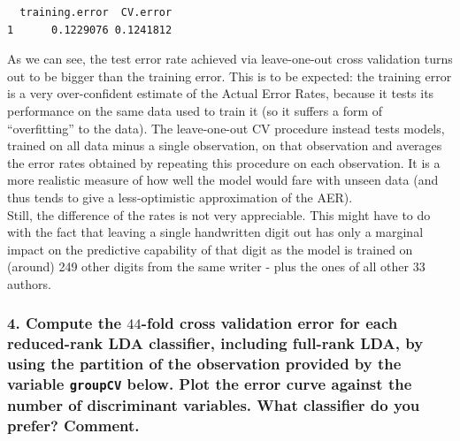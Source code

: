 \documentclass[
  letterpaper,
  DIV=11,
  numbers=noendperiod]{scrartcl}
\begin{document}
\begin{verbatim}
  training.error  CV.error
1      0.1229076 0.1241812
\end{verbatim}

As we can see, the test error rate achieved via leave-one-out cross
validation turns out to be bigger than the training error. This is to be
expected: the training error is a very over-confident estimate of the
Actual Error Rates, because it tests its performance on the same data
used to train it (so it suffers a form of ``overfitting'' to the data).
The leave-one-out CV procedure instead tests models, trained on all data
minus a single observation, on that observation and averages the error
rates obtained by repeating this procedure on each observation. It is a
more realistic measure of how well the model would fare with unseen data
(and thus tends to give a less-optimistic approximation of the AER).\\
Still, the difference of the rates is not very appreciable. This might
have to do with the fact that leaving a single handwritten digit out has
only a marginal impact on the predictive capability of that digit as the
model is trained on (around) 249 other digits from the same writer -
plus the ones of all other 33 authors.

\hypertarget{compute-the-44-fold-cross-validation-error-for-each-reduced-rank-lda-classifier-including-full-rank-lda-by-using-the-partition-of-the-observation-provided-by-the-variable-groupcv-below.-plot-the-error-curve-against-the-number-of-discriminant-variables.-what-classifier-do-you-prefer-comment.}{%
\subsubsection{\texorpdfstring{4. Compute the \(44\)-fold cross
validation error for each reduced-rank LDA classifier, including
full-rank LDA, by using the partition of the observation provided by the
variable \texttt{groupCV} below. Plot the error curve against the number
of discriminant variables. What classifier do you prefer?
Comment.}{4. Compute the 44-fold cross validation error for each reduced-rank LDA classifier, including full-rank LDA, by using the partition of the observation provided by the variable groupCV below. Plot the error curve against the number of discriminant variables. What classifier do you prefer? Comment.}}\label{compute-the-44-fold-cross-validation-error-for-each-reduced-rank-lda-classifier-including-full-rank-lda-by-using-the-partition-of-the-observation-provided-by-the-variable-groupcv-below.-plot-the-error-curve-against-the-number-of-discriminant-variables.-what-classifier-do-you-prefer-comment.}}
\end{document}
